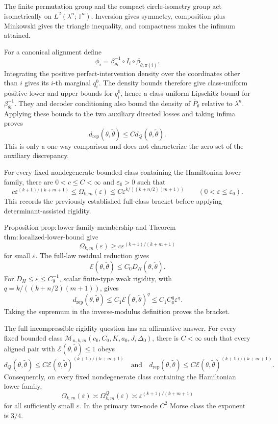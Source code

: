 The finite permutation group and the compact circle-isometry group act isometrically on \(L^2(\lambda^n;\mathbb T^n)\).  Inversion gives symmetry, composition plus Minkowski gives the triangle inequality, and compactness makes the infimum attained.

For a canonical alignment define
\[
 \phi_i=\beta_{\theta i}^{-1}\circ I_i\circ\beta_{\widetilde\theta,\pi(i)}.
\tag{3}
\]
Integrating the positive perfect-intervention density over the coordinates other than \(i\) gives its \(i\)-th marginal \(q_i^0\).  The density bounds therefore give class-uniform positive lower and upper bounds for \(q_i^0\), hence a class-uniform Lipschitz bound for \(\beta_{\theta i}^{-1}\).  They and decoder conditioning also bound the density of \(\bar P_\theta\) relative to \(\lambda^n\).  Applying these bounds to the two auxiliary directed losses and taking infima proves
\[
 d_{\mathrm{rep}}(\theta,\widetilde\theta)\leq C d_Q(\theta,\widetilde\theta).
\tag{4}
\]
This is only a one-way comparison and does not characterize the zero set of the auxiliary discrepancy.

For every fixed nondegenerate bounded class containing the Hamiltonian lower family, there are \(0<c\leq C<\infty\) and \(\varepsilon_0>0\) such that
\[
 c\varepsilon^{(k+1)/(k+m+1)}
 \leq\Omega_{k,m}(\varepsilon)
 \leq C\varepsilon^{k/((k+n/2)(m+1))}
 \qquad(0<\varepsilon\leq\varepsilon_0).
\]
This records the previously established full-class bracket before applying determinant-assisted rigidity.

Proposition \(\mathrm{prop:lower\text{-}family\text{-}membership}\) and Theorem \(\mathrm{thm:localized\text{-}lower\text{-}bound}\) give
\[
 \Omega_{k,m}(\varepsilon)\geq c\varepsilon^{(k+1)/(k+m+1)}
\tag{1}
\]
for small \(\varepsilon\).  The full-law residual reduction gives
\[
 \mathcal E(\theta,\widetilde\theta)\leq C_0D_H(\theta,\widetilde\theta).
\tag{2}
\]
For \(D_H\leq\varepsilon\leq C_0^{-1}\), scalar finite-type weak rigidity, with \(q=k/((k+n/2)(m+1))\), gives
\[
 d_{\mathrm{rep}}(\theta,\widetilde\theta)
 \leq C_1\mathcal E(\theta,\widetilde\theta)^q
 \leq C_1C_0^q\varepsilon^q.
\tag{3}
\]
Taking the supremum in the inverse-modulus definition proves the bracket.

The full incompressible-rigidity question has an affirmative answer.  For every fixed bounded class \(\mathcal M_{n,k,m}(c_0,C_0,K,a_0,J,\Delta_0)\), there is \(C<\infty\) such that every aligned pair with \(\mathcal E(\theta,\widetilde\theta)\leq1\) obeys
\[
 d_Q(\theta,\widetilde\theta)
 \leq C\mathcal E(\theta,\widetilde\theta)^{(k+1)/(k+m+1)}
 \quad\text{and}\quad
 d_{\mathrm{rep}}(\theta,\widetilde\theta)
 \leq C\mathcal E(\theta,\widetilde\theta)^{(k+1)/(k+m+1)}.
\]
Consequently, on every fixed nondegenerate class containing the Hamiltonian lower family,
\[
 \Omega_{k,m}(\varepsilon)\asymp
 \Omega^Q_{k,m}(\varepsilon)\asymp
 \varepsilon^{(k+1)/(k+m+1)}
\]
for all sufficiently small \(\varepsilon\).  In the primary two-node \(C^2\) Morse class the exponent is \(3/4\).


